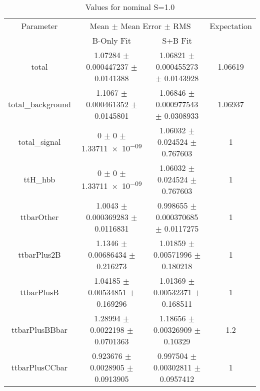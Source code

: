 \begin{table}
\centering
\caption{Values for nominal S=1.0}
\begin{tabular}{cccc}
\toprule
Parameter & \multicolumn{2}{c}{Mean $\pm$ Mean Error $\pm$ RMS} & Expectation\\
 & B-Only Fit & S+B Fit & \\
\midrule
total & \num{1.07284} $\pm$ \num{0.000447237} $\pm$ \num{0.0141388} & \num{1.06821} $\pm$ \num{0.000455273} $\pm$ \num{0.0143928} & \num{1.06619}\\
total\_background & \num{1.1067} $\pm$ \num{0.000461352} $\pm$ \num{0.0145801} & \num{1.06846} $\pm$ \num{0.000977543} $\pm$ \num{0.0308933} & \num{1.06937}\\
total\_signal & \num{0} $\pm$ \num{0} $\pm$ \num{1.33711e-09} & \num{1.06032} $\pm$ \num{0.024524} $\pm$ \num{0.767603} & \num{1}\\
ttH\_hbb & \num{0} $\pm$ \num{0} $\pm$ \num{1.33711e-09} & \num{1.06032} $\pm$ \num{0.024524} $\pm$ \num{0.767603} & \num{1}\\
ttbarOther & \num{1.0043} $\pm$ \num{0.000369283} $\pm$ \num{0.0116831} & \num{0.998655} $\pm$ \num{0.000370685} $\pm$ \num{0.0117275} & \num{1}\\
ttbarPlus2B & \num{1.1346} $\pm$ \num{0.00686434} $\pm$ \num{0.216273} & \num{1.01859} $\pm$ \num{0.00571996} $\pm$ \num{0.180218} & \num{1}\\
ttbarPlusB & \num{1.04185} $\pm$ \num{0.00534851} $\pm$ \num{0.169296} & \num{1.01369} $\pm$ \num{0.00532371} $\pm$ \num{0.168511} & \num{1}\\
ttbarPlusBBbar & \num{1.28994} $\pm$ \num{0.0022198} $\pm$ \num{0.0701363} & \num{1.18656} $\pm$ \num{0.00326909} $\pm$ \num{0.10329} & \num{1.2}\\
ttbarPlusCCbar & \num{0.923676} $\pm$ \num{0.0028905} $\pm$ \num{0.0913905} & \num{0.997504} $\pm$ \num{0.00302811} $\pm$ \num{0.0957412} & \num{1}\\
\bottomrule
\end{tabular}
\end{table}
